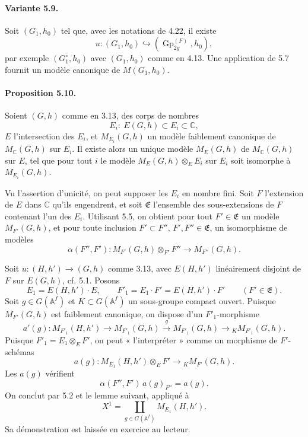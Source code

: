 \documentclass[10pt]{article}
\newcommand{\Af}{\mathbb A^f}
\newcommand{\C}{\mathbb C}
\newcommand{\Gp}{\operatorname{Gp}}
\newcommand{\MC}{M_{\C}}
\begin{document}
\paragraph{Variante 5.9.} Soit $(G_1,h_0)$ tel que, avec les notations de 4.22, il existe
\[
u:(G_1,h_0)\hookrightarrow(\Gp_{2g}^{(F)},h_0),
\]
par exemple $(G_1^\circ,h_0)$ avec $(G_1,h_0)$ comme en 4.13. Une application de 5.7 fournit un modèle canonique de $M(G_1,h_0)$.

\paragraph{Proposition 5.10.} Soient $(G,h)$ comme en 3.13, des corps de nombres
\[
E_i:\ E(G,h)\subset E_i\subset\C,
\]
$E$ l'intersection des $E_i$, et $M_{E_i}(G,h)$ un modèle faiblement canonique de $\MC(G,h)$ sur $E_i$. Il existe alors un unique modèle $M_E(G,h)$ de $\MC(G,h)$ sur $E$, tel que pour tout $i$ le modèle $M_E(G,h)\otimes_EE_i$ sur $E_i$ soit isomorphe à $M_{E_i}(G,h)$.

Vu l'assertion d'unicité, on peut supposer les $E_i$ en nombre fini. Soit $F$ l'extension de $E$ dans $\C$ qu'ils engendrent, et soit $\mathfrak E$ l'ensemble des sous-extensions de $F$ contenant l'un des $E_i$. Utilisant 5.5, on obtient pour tout $F'\in\mathfrak E$ un modèle $M_{F'}(G,h)$, et pour toute inclusion $F'\subset F''$, $F',F''\in\mathfrak E$, un isomorphisme de modèles
\[
\alpha(F'',F'):M_{F'}(G,h)\otimes_{F'}F''\longrightarrow M_{F''}(G,h).
\]

Soit $u:(H,h')\to(G,h)$ comme 3.13, avec $E(H,h')$ linéairement disjoint de $F$ sur $E(G,h)$, cf. 5.1. Posons
\[
E_1=E(H,h')\cdot E,\qquad F'_1=E_1\cdot F'=E(H,h')\cdot F'\qquad(F'\in\mathfrak E).
\]
Soit $g\in G(\Af)$ et $K\subset G(\Af)$ un sous-groupe compact ouvert. Puisque $M_{F'}(G,h)$ est faiblement canonique, on dispose d'un $F'_1$-morphisme
\[
a'(g):M_{F'_1}(H,h')\longrightarrow M_{F'_1}(G,h)
 \xrightarrow{\ g\ } M_{F'_1}(G,h)
 \longrightarrow {}_K M_{F'_1}(G,h).
\]
Puisque $F'_1=E_1\otimes_EF'$, on peut « l'interpréter » comme un morphisme de $F'$-schémas
\[
a(g):M_{E_1}(H,h')\otimes_EF'\longrightarrow {}_K M_{F'}(G,h).
\]
Les $a(g)$ vérifient
\[
\alpha(F'',F')\,a(g)_{F''}=a(g).
\]
On conclut par 5.2 et le lemme suivant, appliqué à
\[
X^1=\coprod_{g\in G(\Af)}M_{E_1}(H,h').
\]
Sa démonstration est laissée en exercice au lecteur.
\end{document}
